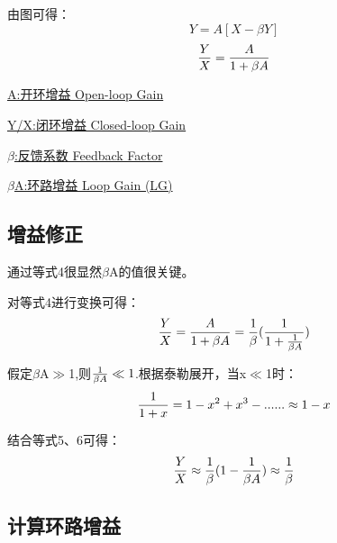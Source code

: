 \documentclass[]{ctexart}
\begin{document}
    由图可得：
    \begin{equation}
        Y=A[X-{\beta}Y]
    \end{equation}
    \begin{equation}
        {Y \over X}={A \over 1+{\beta}A}
    \end{equation}

    \underline{A:开环增益 Open-loop Gain}

    \underline{Y/X:闭环增益 Closed-loop Gain}

    \underline{$\beta$:反馈系数 Feedback Factor}

    \underline{$\beta$A:环路增益 Loop Gain (LG)}

\subsection{增益修正}
    通过等式4很显然$\beta$A的值很关键。

    对等式4进行变换可得：
    \begin{equation}
        {Y \over X}={A \over 1+{\beta}A}={1\over\beta}({1\over1+{1\over\beta A}})
    \end{equation}

    假定$\beta$A$\gg$1,则${1\over\beta A}\ll1$.根据泰勒展开，当x$\ll $1时：
    \begin{equation}
        {1 \over 1+x}=1-x^2+x^3-......\approx 1-x
    \end{equation}

    结合等式5、6可得：
    \begin{equation}
        {Y\over X}\approx{1\over\beta}(1-{1\over\beta A})\approx{1\over\beta}
    \end{equation}
    
\subsection{计算环路增益}
\end{document}
